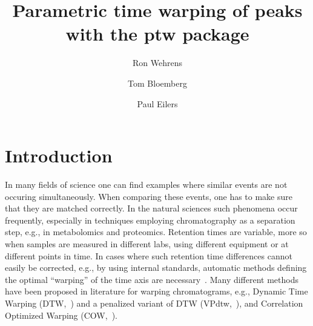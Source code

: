\documentclass[a4paper,11pt]{article}
\title{Parametric time warping of peaks with the ptw package}
\author{Ron Wehrens \and Tom Bloemberg \and Paul Eilers}
\begin{document}
\maketitle

\section{Introduction}
In many fields of science one can find examples where similar events
are not occuring simultaneously. When comparing these events, one has
to make sure that they are matched correctly. In the natural sciences
such phenomena occur frequently,
especially in techniques employing chromatography as a
separation step, e.g., in metabolomics and proteomics. Retention times
are variable, more so when samples are measured in different labs,
using different equipment or at different points in time. In cases
where such retention time differences cannot easily be corrected,
e.g., by using internal standards, automatic methods defining the
optimal ``warping'' of the time axis are necessary~\citet{Bloemberg2013}.
Many different methods have been proposed in literature for warping
chromatograms, e.g., Dynamic Time Warping (DTW,~\citet{Wang1987}) and
a penalized variant of DTW (VPdtw,~\citet{Clifford2012}), and
Correlation Optimized Warping (COW,~\citet{Tomasi2004}).
\end{document}
